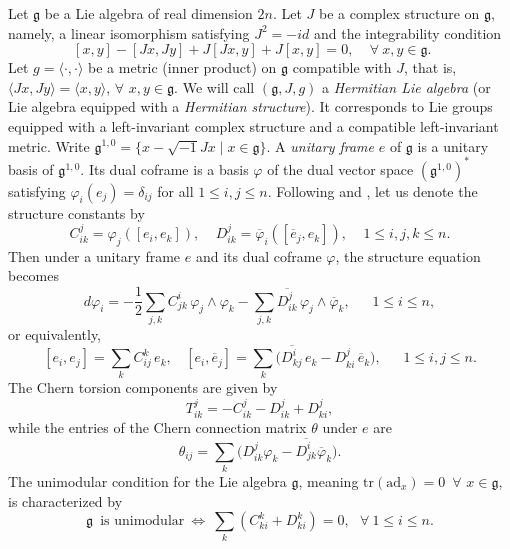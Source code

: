 \documentclass{amsart}
\numberwithin{equation}{section}
\theoremstyle{definition}
\renewcommand{\1}{\mathds{1}}
\renewcommand{\>}{\rightarrow}
\begin{document}
Let ${\mathfrak g}$ be a Lie algebra of real dimension $2n$. Let $J$ be a complex structure on ${\mathfrak g}$, namely, a linear isomorphism satisfying $J^2=-id$ and the integrability condition
$$ [x,y]-[Jx,Jy] +J[Jx,y] + J[x,y] =0, \ \ \ \ \ \forall \ x,y \in {\mathfrak g}. \ \ \ \ \ $$
Let $g=\langle \cdot , \cdot \rangle$ be a metric (inner product) on ${\mathfrak g}$ compatible with $J$, that is, $\langle Jx,Jy\rangle =\langle x,y\rangle$, $\forall$  $x,y\in {\mathfrak g}$. We will call $({\mathfrak g}, J,g)$ a {\em Hermitian Lie algebra} (or Lie algebra equipped with a {\em Hermitian structure}). It corresponds to Lie groups equipped with a left-invariant complex structure and a compatible left-invariant metric. Write ${\mathfrak g}^{1,0}=\{ x-\sqrt{-1}Jx \mid x\in {\mathfrak g}\}$. A {\em unitary frame} $e$ of ${\mathfrak g}$ is a unitary basis of ${\mathfrak g}^{1,0}$. Its dual coframe is a basis $\varphi$ of the dual vector space $({\mathfrak g}^{1,0})^{\ast}$ satisfying $\varphi_i(e_j)=\delta_{ij}$ for all $1\leq i,j\leq n$. Following \cite{VYZ} and \cite{ChenZ25}, let us denote the structure constants by
$$ C^j_{ik} = \varphi_j( [e_i, e_k]), \ \ \ \ \ D^j_{ik} = \overline{\varphi}_i ( [\overline{e}_j, e_k]), \ \ \ \ \ 1\leq i,j,k\leq n. $$
Then under a unitary frame $e$ and its dual coframe $\varphi$, the structure equation becomes
\begin{equation} \label{structureLie}
d\varphi_i = -\frac{1}{2}\sum_{j,k} C^i_{jk} \,\varphi_j \wedge \varphi_k - \sum_{j,k} \overline{D^j_{ik}} \,\varphi_j \wedge \overline{\varphi}_k, \ \ \ \ \ \ \  1\leq i\leq n,
\end{equation}
or equivalently,
\begin{equation*} \label{strucgtureLie2}
[e_i,e_j]=\sum_k C^k_{ij}\,e_k, \ \ \ \ [e_i,\overline{e}_j] = \sum_k \big( \overline{D^i_{kj}} \,e_k - D^j_{ki} \,\overline{e}_k \big) , \ \ \ \ \ \ \ 1\leq i,j\leq n.
\end{equation*}
The Chern torsion components are given by
\begin{equation*} \label{torsionLie}
T^j_{ik} = - C^j_{ik} - D^j_{ik} + D^j_{ki},
\end{equation*}
while the entries of the Chern connection matrix $\theta$ under $e$ are
\begin{equation*} \label{ChernconnectionLie}
\theta_{ij} = \sum_k \big( D^j_{ik}\varphi_k - \overline{ D^i_{jk} } \overline{\varphi}_k \big) .
\end{equation*}
The unimodular condition for the Lie algebra ${\mathfrak g}$, meaning $\mbox{tr}(\mbox{ad}_x)=0$\, $\forall$ $x\in {\mathfrak g}$,
is characterized by
\begin{equation} \label{unimodular}
 {\mathfrak g} \,\mbox{ is unimodular} \ \Longleftrightarrow \ \sum_k (C^k_{ki}+D^k_{ki}) =0, \ \ \ \forall \ 1\leq i\leq n.
\end{equation}
\end{document}
